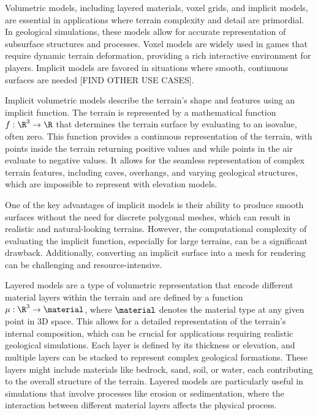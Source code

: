 Volumetric models, including layered materials, voxel grids, and implicit models, are essential in applications where terrain complexity and detail are primordial. In geological simulations, these models allow for accurate representation of subsurface structures and processes. Voxel models are widely used in games that require dynamic terrain deformation, providing a rich interactive environment for players. Implicit models are favored in situations where smooth, continuous surfaces are needed [FIND OTHER USE CASES].

Implicit volumetric models describe the terrain's shape and features using an implicit function. The terrain is represented by a mathematical function $f: \R^3 \to \R$ that determines the terrain surface by evaluating to an isovalue, often zero. This function provides a continuous representation of the terrain, with points inside the terrain returning positive values and while points in the air evaluate to negative values. It allows for the seamless representation of complex terrain features, including caves, overhangs, and varying geological structures, which are impossible to represent with  elevation models.

One of the key advantages of implicit models is their ability to produce smooth surfaces without the need for discrete polygonal meshes, which can result in realistic and natural-looking terrains. However, the computational complexity of evaluating the implicit function, especially for large terrains, can be a significant drawback. Additionally, converting an implicit surface into a mesh for rendering can be challenging and resource-intensive. \cite{Araujo2015} 

Layered models are a type of volumetric representation that encode different material layers within the terrain and are defined by a function $\mu : \R^3 \to \material$, where $\material$ denotes the material type at any given point in 3D space. This allows for a detailed representation of the terrain's internal composition, which can be crucial for applications requiring realistic geological simulations. Each layer is defined by its thickness or elevation, and multiple layers can be stacked to represent complex geological formations. These layers might include materials like bedrock, sand, soil, or water, each contributing to the overall structure of the terrain. Layered models are particularly useful in simulations that involve processes like erosion or sedimentation, where the interaction between different material layers affects the physical process.

